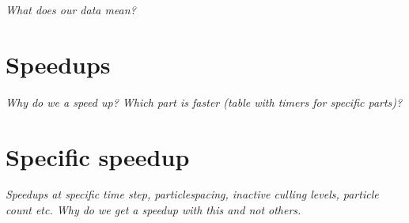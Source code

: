\documentclass[../main.tex]{subfiles}
\begin{document}
\textit{What does our data mean?}


\section{Speedups}
\textit{Why do we a speed up? Which part is faster (table with timers for specific parts)?}


\section{Specific speedup}
\textit{Speedups at specific time step, particlespacing, inactive culling levels, particle count etc. Why do we get a speedup with this and not others. }
\end{document}
